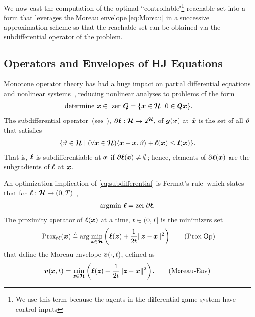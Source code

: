We now cast the computation of the optimal ``controllable"\footnote{We use this term because the agents in the differential game system have control inputs} reachable set into a form that leverages the Moreau envelope \eqref{eq:Moreau} in a successive approximation scheme so that the reachable set can be obtained via the subdifferential operator of the problem.

\subsection{Operators and Envelopes of HJ Equations}
Monotone operator theory has had a huge impact on partial differential equations and nonlinear systems~\citet{Zarantonello71, BotAndHendrich2014}, reducing nonlinear analyses to problems of the form
%
\begin{align}
\text{ determine } \bm{x} \in \text{ zer } \bm{Q} = \{\bm{x} \in \bm{\mathcal{H}} \, | \, 0 \in \bm{Q} \bm{x} \}.
\end{align}
%
	The subdifferential operator~(see~\citet[\S 16]{BauschkeCombettes}), $\partial \bm{\ell}: \bm{\mathcal{H}} \rightarrow 2^{\bm{\mathcal{H}}}$, of $\bm{g}(\bm{x})$ at $\bar{\bm{x}}$ is the set of all $\vartheta$ that satisfies
%
\begin{align}
\{\vartheta\in \bm{\mathcal{H}} \mid (\forall \bm{x} \in \bm{\mathcal{H}}) \langle \bm{x} - \bar{\bm{x}} , \vartheta\rangle + \bm{\ell}(\bar{\bm{x}}) \le \bm{\ell}(\bm{x})\}.
\label{eq:subdifferential}
\end{align}
%
That is, $\bm{\ell}$ is subdifferentiable at $\bm{x}$ if $\partial \bm{\ell}(\bm{x}) \neq \emptyset$; hence, elements of $\partial \bm{\ell}(\bm{x})$ are the subgradients of $\bm{\ell}$ at $\bm{x}$.

An optimization implication of \eqref{eq:subdifferential} is Fermat's rule, which states that for $\bm{\ell}: \bm{\mathcal{H}} \rightarrow (0, T)$~\citet{Moreau65},
%
\begin{align}
\text{argmin} \,\, \bm{\ell} = \text{zer}\, \partial \bm{\ell}.
\end{align}
%
The proximity operator of $\bm{\ell}(\bm{x})$ at a time, $t \in (0, T]$ is the minimizers set~\citet{MoreauDualCvxProxPts} 
%
\begin{align}
\text{ Prox}_{t\bm{\ell}}(\bm{x}) \triangleq \arg \min_{\bm{z} \in \bm{\mathcal{H}} }  \left(\bm{\ell}(\bm{z}) + \frac{1}{2t}\| \bm{z} - \bm{x} \|^2\right)
\tag{Prox-Op}
\label{eq:proximal}
\end{align}
%
that define the Moreau envelope $\bm{v}(\cdot, t)$, defined as~\citet{Moreau}
%
\begin{align}
\bm{v}(\bm{x}, t) = \min_{\bm{z} \in \bm{\mathcal{H}} }  \left(\bm{\ell}(\bm{z}) + \frac{1}{2t}\| \bm{z} - \bm{x}\|^2\right).
\tag{Moreau-Env}
\label{eq:Moreau}
\end{align}
%

